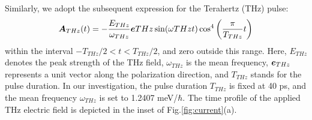 Similarly, we adopt the subsequent expression for the Terahertz (THz) pulse:
\begin{align}
\boldsymbol A_{THz}(t) = -\frac{E_{THz}}{\omega_{THz}} \boldsymbol{e}{THz}
\sin(\omega{THz} t) \cos^4 \left (\frac{\pi}{T_{THz}} t \right)
\label{eqn:laser_pulse}
\end{align}
within the interval $-T_{THz}/2 < t < T_{THz}/2$, and zero outside this range. Here, $E_{THz}$ denotes the peak strength of the THz field, $\omega_{THz}$ is the mean frequency, $\boldsymbol e_{THz}$ represents a unit vector along the polarization direction, and $T_{THz}$ stands for the pulse duration. In our investigation, the pulse duration $T_{THz}$ is fixed at 40 ps, and the mean frequency $\omega_{THz}$ is set to 1.2407 meV/$\hbar$. The time profile of the applied THz electric field is depicted in the inset of Fig.\ref{fig:current}(a).

